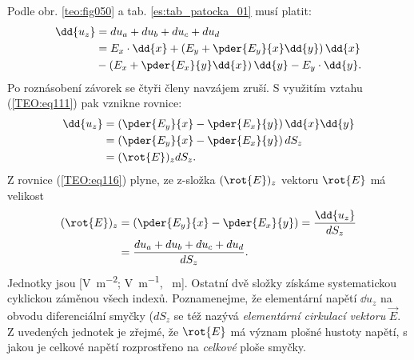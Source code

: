         Podle obr. \ref{teo:fig050} a tab. \ref{es:tab_patocka_01} musí platit:
        \begin{align*}
          \dd{u_z} &= du_a + du_b + du_c + du_d                                            \\ 
               &= E_x\cdot\dd{x} + \left(E_y + \pder{E_y}{x}\dd{y}\right)\dd{x}            \\
               &- \left(E_x+\pder{E_x}{y}\dd{x}\right)\dd{y}-E_y\cdot \dd{y}. 
        \end{align*}
        Po roznásobení závorek se čtyři členy navzájem zruší. S využitím vztahu 
        (\ref{TEO:eq111}) pak vznikne rovnice:
        \begin{align}
          \dd{u_z}
            &= \left(\pder{E_y}{x} - \pder{E_x}{y}\right)\dd{x}\dd{y}            \nonumber \\
            &= \left(\pder{E_y}{x} - \pder{E_x}{y}\right)dS_z                    \nonumber \\
            &= (\rot{E})_z dS_z.                                                 \label{TEO:eq116}
        \end{align}
        Z rovnice (\ref{TEO:eq116}) plyne, ze z-složka \((\rot{E})_z\) vektoru \(\rot{E}\) 
        má velikost
        \begin{align}
          (\rot{E})_z &= \left(\pder{E_y}{x} - \pder{E_x}{y}\right)        
                       = \frac{\dd{u_z}}{dS_z}                         \nonumber  \\
                      &= \frac{du_a + du_b + du_c + du_d}{dS_z}.       \label{TEO:eq117}
        \end{align}
        Jednotky jsou [\unit{\V\per\square\m}; \unit{\V\per\m}, \unit{\per\m}]. Ostatní dvě složky získáme
        systematickou cyklickou záměnou všech indexů. Poznamenejme, že elementární napětí
        \(\dd{u_z}\) na obvodu diferenciální smyčky (\(dS_z\) se též nazývá \emph{elementární
        cirkulací vektoru} \(\vec{E}\). Z uvedených jednotek je zřejmé, že \(\rot{E}\) má význam
        plošné hustoty napětí, s jakou je celkové napětí rozprostřeno na \emph{celkové} ploše
        smyčky.
      
